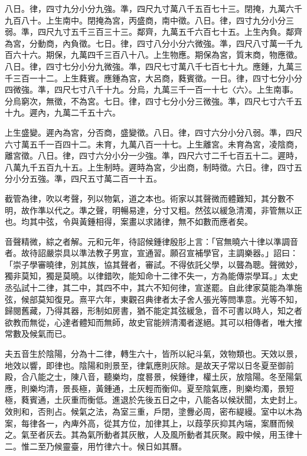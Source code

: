 \begin{pinyinscope}
八日。律，四寸九分小分九強。準，四尺九寸萬八千五百七十三。閉掩，九萬六千九百八十。上生南中。閉掩為宮，丙盛商，南中徵。八日。律，四寸九分小分三弱。準，四尺九寸五千三百三十三。鄰齊，九萬五千六百七十五。上生內負。鄰齊為宮，分動商，內負徵。七日。律，四寸八分小分六微強。準，四尺八寸萬一千九百六十六。期保，九萬四千三百八十八。上生物應。期保為宮，質末商，物應徵。八日。律，四寸七分小分九微強。準，四尺七寸萬八千七百七十九。應鍾，九萬三千三百一十二。上生蕤賓。應鍾為宮，大呂商，蕤賓徵。一日。律，四寸七分小分四微強。準，四尺七寸八千十九。分烏，九萬三千一百一十七〈六〉。上生南事。分烏窮次，無徵，不為宮。七日。律，四寸七分小分三微強。準，四尺七寸六千五十九。遲內，九萬二千五十六。

上生盛變。遲內為宮，分否商，盛變徵。八日。律，四寸六分小分八弱。準，四尺六寸萬五千一百四十二。未育，九萬八百一十七。上生離宮。未育為宮，凌陰商，離宮徵。八日。律，四寸六分小分一少強。準，四尺六寸二千七百五十二。遲時，八萬九千五百九十五。上生制時。遲時為宮，少出商，制時徵。六日。律，四寸五分小分五強。準，四尺五寸萬二百一十五。

截管為律，吹以考聲，列以物氣，道之本也。術家以其聲微而體難知，其分數不明，故作準以代之。準之聲，明暢易達，分寸又粗。然弦以緩急清濁，非管無以正也。均其中弦，令與黃鍾相得，案畫以求諸律，無不如數而應者矣。

音聲精微，綜之者解。元和元年，待詔候鍾律殷肜上言：「官無曉六十律以準調音者。故待詔嚴崇具以準法教子男宣，宣通習。願召宣補學官，主調樂器。」詔曰：「崇子學審曉律，別其族，協其聲者，審試。不得依託父學，以聾為聰。聲微妙，獨非莫知，獨是莫曉。以律錯吹，能知命十二律不失一，方為能傳崇學耳。」太史丞弘試十二律，其二中，其四不中，其六不知何律，宣遂罷。自此律家莫能為準施弦，候部莫知復見。熹平六年，東觀召典律者太子舍人張光等問準意。光等不知，歸閱舊藏，乃得其器，形制如房書，猶不能定其弦緩急，音不可書以時人，知之者欲教而無從，心達者體知而無師，故史官能辨清濁者遂絕。其可以相傳者，唯大搉常數及候氣而已。

夫五音生於陰陽，分為十二律，轉生六十，皆所以紀斗氣，效物類也。天效以景，地效以響，即律也。陰陽和則景至，律氣應則灰除。是故天子常以日冬夏至御前殿，合八能之士，陳八音，聽樂均，度晷景，候鍾律，權土灰，放陰陽。冬至陽氣應，則樂均清，景長極，黃鍾通，土灰輕而衡仰。夏至陰氣應，則樂均濁，景短極，蕤賓通，土灰重而衡低。進退於先後五日之中，八能各以候狀聞，太史封上。效則和，否則占。候氣之法，為室三重，戶閉，塗釁必周，密布緹縵。室中以木為案，每律各一，內庳外高，從其方位，加律其上，以葭莩灰抑其內端，案曆而候之。氣至者灰去。其為氣所動者其灰散，人及風所動者其灰聚。殿中候，用玉律十二。惟二至乃候靈臺，用竹律六十。候日如其曆。


\end{pinyinscope}